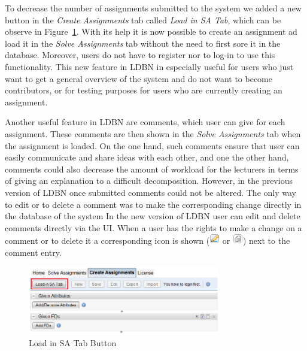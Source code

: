 To decrease the number of assignments submitted to the system we added a new button
in the \emph{Create Assignments} tab called \emph{Load in SA Tab}, which can be observe in Figure~\ref{fig:load-in-sa}.
With its help it is now possible to create an assignment ad load it in the \emph{Solve Assignments} tab without
the need to first sore it in the database. Moreover, users do not have to register nor to log-in to use this
functionality. This new feature in LDBN in especially useful for users who 
just want to get a general overview of the system and
do not want to become contributors, 
or for testing purposes for users who are currently creating an assignment. 


Another useful feature in LDBN are comments, which user can give for each assignment. These comments
are then shown in the \emph{Solve Assignments} tab when the assignment is loaded. On the one
hand, such comments ensure that user can easily communicate and share ideas with each
other, and one the other hand, comments could also decrease the amount of workload
for the lecturers in terms of giving an explanation to a difficult decomposition. However, in the 
previous version of LDBN once submitted comments could not be altered. The only way to edit or to delete a
comment was to make the corresponding change directly in the database of the system 
In the new version of LDBN user can edit and delete comments directly  via the UI. When a user has
the rights to make a change on a comment or to delete it a corresponding icon is shown 
(\includegraphics[scale=0.7]{./img/edit.png} or \includegraphics[scale=0.7]{./img/del.png})
next to the comment entry.

\begin{figure}[h]
	\begin{center}
		\includegraphics[width=0.75\textwidth]{./img/load-in-sa.png}
		\caption{Load in SA Tab Button}
		\label{fig:load-in-sa}
	\end{center}
\end{figure}
